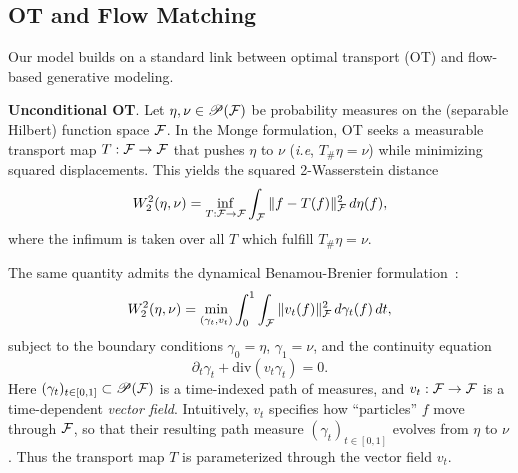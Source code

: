 \subsection{OT and Flow Matching}

Our model builds on a standard link between optimal transport (OT) and flow-based generative modeling. 
%
%

\textbf{Unconditional OT}.
%
Let $\eta,\nu\in\mathscr{P}(\mathcal{F})$ be probability measures on the (separable Hilbert) function space $\mathcal{F}$. 
%
In the Monge formulation, OT seeks a measurable transport map $T:\mathcal{F}\to\mathcal{F}$ that pushes $\eta$ to $\nu$ (\textit{i.e}, $T_{\#}\eta=\nu$) while minimizing squared displacements. 
%
This yields the squared 2-Wasserstein distance
\begin{equation}
W_2^2(\eta,\nu) = \inf_{T:\mathcal{F}\to\mathcal{F}} \int_{\mathcal{F}} \|f - T(f)\|_{\mathcal{F}}^2\, d\eta(f),
\label{eq:w2-functional}
\end{equation}
where the infimum is taken over all $T$ which fulfill $T_{\#}\eta=\nu$.

%
The same quantity admits the dynamical Benamou-Brenier  formulation~\citep{benamou2000computational}:
\begin{equation}
W_2^2(\eta,\nu) = \min_{(\gamma_t,v_t)} \int_0^1\int_{\mathcal{F}} \|v_t(f)\|_{\mathcal{F}}^2\, d\gamma_t(f)\, dt,
\label{eq:benamou_brenier}
\end{equation}
subject to the boundary conditions $\gamma_0=\eta$, $\gamma_1=\nu$, and the continuity equation
\begin{equation}
\partial_t\gamma_t+\mathrm{div}(v_t\gamma_t)=0.
\label{eq:continuity}
\end{equation}
Here $(\gamma_t)_{t\in[0,1]}\subset\mathscr{P}(\mathcal{F})$ is a time-indexed path of measures, and $v_t:\mathcal{F}\to\mathcal{F}$ is a time-dependent \textit{vector field}.
%
Intuitively, $v_t$ specifies how ``particles'' $f$ move through $\mathcal{F}$, so that their resulting path measure $(\gamma_t)_{t\in[0,1]}$ evolves from $\eta$ to $\nu$. Thus the transport map $T$ is parameterized through the vector field $v_t$.
%

